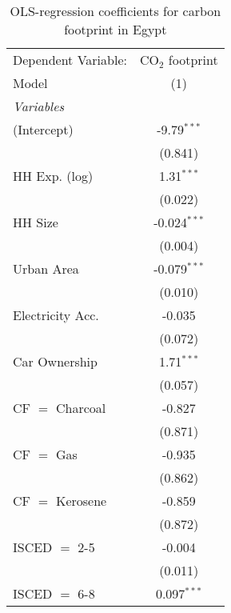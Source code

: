 
\begin{table}[htbp!]
   \centering
   \small
   \begin{adjustbox}{width = 1\textwidth, max height = 0.95\textheight, center}
      \begin{threeparttable}[b]
         \caption{\label{tab:OLS_2_EGY} OLS-regression coefficients for carbon footprint in Egypt}
         \begin{tabular}{lc}
            \tabularnewline \midrule \midrule
            Dependent Variable: & CO$_{2}$ footprint\\  
            Model               & (1)\\  
            \midrule
            \emph{Variables}\\
            (Intercept)         & -9.79$^{***}$\\   
                                & (0.841)\\   
            HH Exp. (log)       & 1.31$^{***}$\\   
                                & (0.022)\\   
            HH Size             & -0.024$^{***}$\\   
                                & (0.004)\\   
            Urban Area          & -0.079$^{***}$\\   
                                & (0.010)\\   
            Electricity Acc.    & -0.035\\   
                                & (0.072)\\   
            Car Ownership       & 1.71$^{***}$\\   
                                & (0.057)\\   
            CF $=$ Charcoal     & -0.827\\   
                                & (0.871)\\   
            CF $=$ Gas          & -0.935\\   
                                & (0.862)\\   
            CF $=$ Kerosene     & -0.859\\   
                                & (0.872)\\   
            ISCED $=$ 2-5       & -0.004\\   
                                & (0.011)\\   
            ISCED $=$ 6-8       & 0.097$^{***}$\\   

\end{tabular}
\end{threeparttable}
\end{adjustbox}
\end{table}
